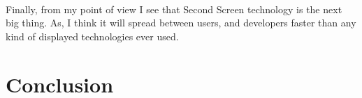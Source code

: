 \documentclass[12pt, oneside]{article}   	%
\begin{document}
   \paragraph{}
Finally, from my point of view I see that Second Screen technology is the next big thing.  As, I think it will spread between users, and developers faster than any kind of displayed technologies ever used.  
 \section{Conclusion}


 
 

 
 
\end{document}
